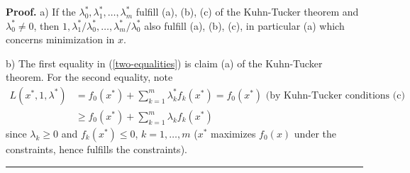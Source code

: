 \documentclass[11pt,twoside]{article}%
\theoremstyle{change}
\newenvironment{proof}[1][Proof]{\textbf{#1.} }{\ \rule{0.5em}{0.5em}}
\begin{document}
\begin{proof}
a) If the $\lambda_{0}^{\ast},\lambda_{1}^{\ast},\ldots,\lambda_{m}^{\ast}$
fulfill (a), (b), (c) of the Kuhn-Tucker theorem and $\lambda_{0}^{\ast}\neq
0$, then $1,\lambda_{1}^{\ast}/\lambda_{0}^{\ast},\ldots,\lambda_{m}^{\ast
}/\lambda_{0}^{\ast}$ also fulfill (a), (b), (c), in particular (a) which
concerns minimization in $x$.

b) The first equality in (\ref{two-equalities}) is claim (a) of the
Kuhn-Tucker theorem. For the second equality, note
\begin{align*}
L(x^{\ast},1,\lambda^{\ast})  & =f_{0}(x^{\ast})+\sum_{k=1}^{m}\lambda
_{k}^{\ast}f_{k}(x^{\ast})=f_{0}(x^{\ast})\text{ (by Kuhn-Tucker conditions
(c)}\\
& \geq f_{0}(x^{\ast})+\sum_{k=1}^{m}\lambda_{k}f_{k}(x^{\ast})\text{ }%
\end{align*}
since $\lambda_{k}\geq0$ and $f_{k}(x^{\ast})\leq0$, $k=1,\ldots,m$ ($x^{\ast
}$ maximizes $f_{0}(x)$ under the constraints, hence fulfills the constraints).
\end{proof}

\bigskip\bigskip
\end{document}
